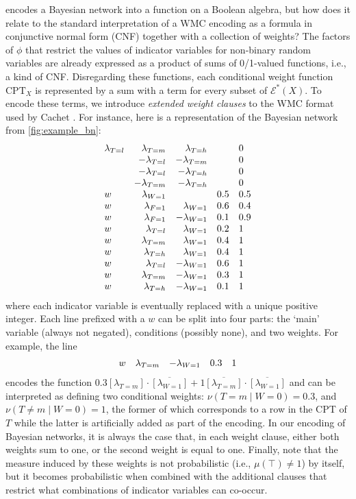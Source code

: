 \documentclass{article}
\begin{document}
 encodes a Bayesian network into a function on a Boolean
algebra, but how does it relate to the standard interpretation of a WMC encoding
as a formula in conjunctive normal form (CNF) together with a collection of
weights? The factors of $\phi$ that restrict the values of indicator variables
for non-binary random variables are already expressed as a product of sums of
0/1-valued functions, i.e., a kind of CNF. Disregarding these functions, each
conditional weight function $\mathrm{CPT}_X$ is represented by a sum with a term
for every subset of $\mathcal{E}^*(X)$. To encode these terms, we introduce
\emph{extended weight clauses} to the WMC format used by Cachet
\cite{DBLP:conf/sat/SangBBKP04}. For instance, here is a representation of the
Bayesian network from \cref{fig:example_bn}:
\[
  \begin{array}{lrrll}
    \lambda\sb{T=l} &\lambda\sb{T=m} &\lambda\sb{T=h} & &0 \\
                    &-\lambda\sb{T=l} &-\lambda\sb{T=m} & &0 \\
                    &-\lambda\sb{T=l} &-\lambda\sb{T=h} & &0 \\
                    &-\lambda\sb{T=m} &-\lambda\sb{T=h} & &0 \\
    w &\lambda\sb{W=1} & &0.5 &0.5 \\
    w &\lambda\sb{F=1} &\lambda\sb{W=1} &0.6 &0.4 \\
    w &\lambda\sb{F=1} &-\lambda\sb{W=1} &0.1 &0.9 \\
    w &\lambda\sb{T=l} &\lambda\sb{W=1} &0.2 &1 \\
    w &\lambda\sb{T=m} &\lambda\sb{W=1} &0.4 &1 \\
    w &\lambda\sb{T=h} &\lambda\sb{W=1} &0.4 &1 \\
    w &\lambda\sb{T=l} &-\lambda\sb{W=1} &0.6 &1 \\
    w &\lambda\sb{T=m} &-\lambda\sb{W=1} &0.3 &1 \\
    w &\lambda\sb{T=h} &-\lambda\sb{W=1} &0.1 &1
  \end{array}
\]
where each indicator variable is eventually replaced with a unique positive
integer. Each line prefixed with a $w$ can be split into four parts: the `main'
variable (always not negated), conditions (possibly none), and two weights. For
example, the line
\[
  \begin{array}{lrrll}
    w &\lambda\sb{T=m} &-\lambda\sb{W=1} &0.3 &1
  \end{array}
\]
encodes the function $0.3[\lambda_{T=m}] \cdot \overline{[\lambda_{W=1}]} +
1\overline{[\lambda_{T=m}]} \cdot \overline{[\lambda_{W=1}]}$ and can be
interpreted as defining two conditional weights: $\nu(T = m \mid W = 0) = 0.3$,
and $\nu(T \ne m \mid W = 0) = 1$, the former of which corresponds to a row in
the CPT of $T$ while the latter is artificially added as part of the encoding.
In our encoding of Bayesian networks, it is always the case that, in each weight
clause, either both weights sum to one, or the second weight is equal to one.
Finally, note that the measure induced by these weights is not probabilistic
(i.e., $\mu(\top) \ne 1$) by itself, but it becomes probabilistic when combined
with the additional clauses that restrict what combinations of indicator
variables can co-occur.
\end{document}
